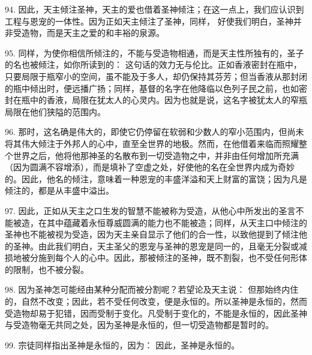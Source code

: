 94. 因此，天主倾注圣神，天主的爱也借着圣神倾注；在这一点上，我们应认识到工程与恩宠的一体性。因为正如天主倾注了圣神，同样，  好使我们明白，圣神并非受造物，而是天主之爱的和丰裕的泉源。\par

95. 同样，为使你相信所倾注的，不能与受造物相通，而是天主性所独有的，圣子的名也被倾注，如你所读到的：  这句话的效力无与伦比。正如香液密封在瓶中，只要局限于瓶窄小的空间，虽不能及于多人，却仍保持其芬芳；但当香液从那封闭的瓶中倾出时，便远播广扬；同样，基督的名字在他降临以色列子民之前，也如密封在瓶中的香液，局限在犹太人的心灵内。因为也就是说，这名字被犹太人的窄瓶局限在他们狭隘的范围内。\par

96. 那时，这名确是伟大的，即使它仍停留在软弱和少数人的窄小范围内，但尚未将其伟大倾注于外邦人的心中，直至全世界的地极。然而，在他借着来临而照耀整个世界之后，他将他那神圣的名散布到一切受造物之中，并非由任何增加所充满（因为圆满不容增添），而是填补了空虚之处，好使他的名在全世界内成为奇妙的。因此，他名的倾注，意味着一种恩宠的丰盛洋溢和天上财富的富饶；因为凡是倾注的，都是从丰盛中溢出。\par

97. 因此，正如从天主之口生发的智慧不能被称为受造，从他心中所发出的圣言不能被造，在其中蕴藏着永恒尊威圆满的能力也不能被造；同样，从天主口中倾注的圣神也不能被视为受造，因为天主亲自显示了他们的合一性，以致他提到了倾注他的圣神。由此我们明白，天主圣父的恩宠与圣神的恩宠是同一的，且毫无分裂或减损地被分施到每个人的心中。因此，那被倾注的圣神，既不割裂，也不受任何形体的限制，也不被分裂。\par

98. 因为圣神怎可能经由某种分配而被分割呢？若望论及天主说： 但那始终内住的，自然不改变；因此，若不受任何改变，便是永恒的。所以圣神是永恒的，然而受造物却易于犯错，因而受制于变化。凡受制于变化的，不能是永恒的，因此圣神与受造物毫无共同之处，因为圣神是永恒的，但一切受造物都是暂时的。\par

99. 宗徒同样指出圣神是永恒的，因为： 因此，圣神是永恒的。\par

